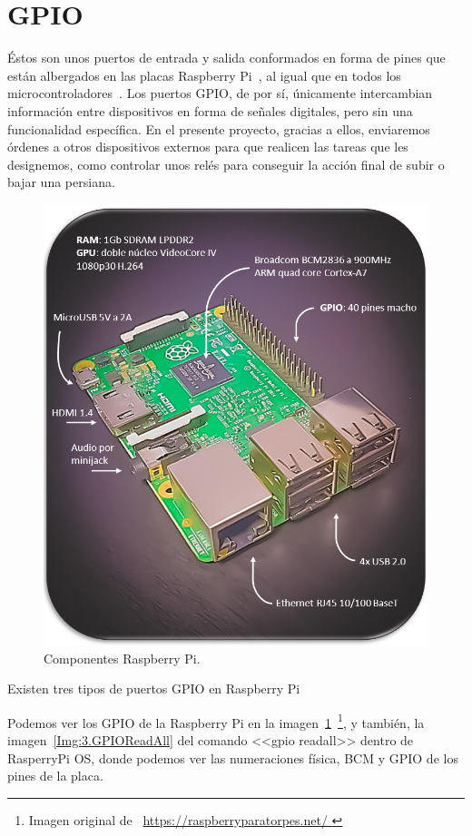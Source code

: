 \section{GPIO}\label{concepto:GPIO}
Éstos son unos puertos de entrada y salida conformados en forma de pines que están albergados en las placas Raspberry Pi~\cite{misc:RbPWeb}, al igual que en todos los microcontroladores~\cite{misc:descubrearduino}. Los puertos GPIO, de por sí, únicamente intercambian información entre dispositivos en forma de señales digitales, pero sin una funcionalidad específica. En el presente proyecto, gracias a ellos, enviaremos órdenes a otros dispositivos externos para que realicen las tareas que les designemos, como controlar unos relés para conseguir la acción final de subir o bajar una persiana.
\begin{figure}[h]
    \centering
\includegraphics[width=.7\textwidth]{img/fotos/RbP_bueno.PNG}
\caption[Componentes Raspberry Pi]{Componentes Raspberry Pi.} \label{Img:3.RaspberryPi}
\end{figure}


Existen tres tipos de puertos GPIO en Raspberry Pi

Podemos ver los GPIO de la Raspberry Pi en la imagen~\ref{Img:3.RaspberryPi}~\footnote{Imagen original de ~\url{https://raspberryparatorpes.net/ }}, y también, la imagen~\ref{Img:3.GPIOReadAll} del comando <<gpio readall>> dentro de RasperryPi OS, donde podemos ver las numeraciones física, BCM y GPIO de los pines de la placa.

